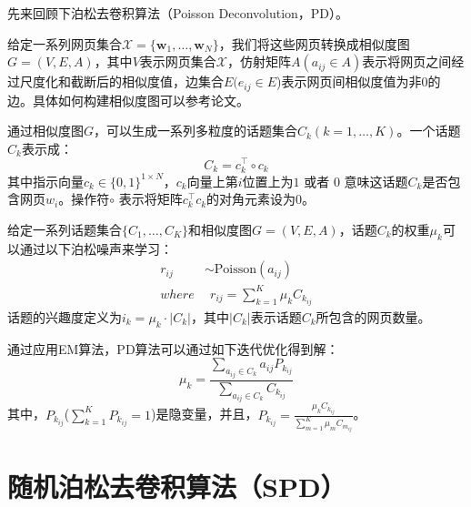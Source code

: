 先来回顾下泊松去卷积算法（Poisson Deconvolution，PD）\citep{pang-2013-unsupervised}。

给定一系列网页集合$\mathcal{X}=\{\mathbf{w}_1,\ldots,\mathbf{w}_N\}$，我们将这些网页转换成相似度图$G=(V,E,A)$，其中$V$表示网页集合$\mathcal{X}$，仿射矩阵$A(a_{ij}\in A)$表示将网页之间经过尺度化和截断后的相似度值，边集合$E(e_{ij}\in E$)表示网页间相似度值为非0的边。具体如何构建相似度图可以参考论文\citep{pang-tao-2016-lpd}。

通过相似度图$G$，可以生成一系列多粒度的话题集合$C_k(k=1,\ldots,K)$。一个话题$C_k$表示成：
\begin{equation}\label{eqt:ck}
C_{k} = c^{\top}_k{\circ} c_k
\end{equation}
其中指示向量$c_k\in\{0,1\}^{1\times N}$，$c_k$向量上第$i$位置上为$1$ 或者 $0$ 意味这话题$C_k$是否包含网页$w_i$。操作符$\circ$ 表示将矩阵$c^{\top}_k c_k$的对角元素设为0。

给定一系列话题集合$\{C_1,\ldots, C_K\}$和相似度图\mbox{$G=(V,E,A)$}，话题$C_k$的权重$\mu_k$可以通过以下泊松噪声来学习：
\begin{equation} \label{eq:poissondeconvolution}
\begin{split}
r_{ij} & \sim \text{Poisson}(a_{ij})\\
where & \ \ r_{ij} = \sum_{k=1}^{K} \mu_k C_{k_{ij}}
\end{split}
\end{equation}
话题的兴趣度定义为$i_k=\mu_k\cdot |C_k|$，其中$|C_k|$表示话题$C_k$所包含的网页数量。

通过应用EM算法，PD算法可以通过如下迭代优化得到解：
\begin{equation} \label{eq:iterationofPD}
    \mu_k = \frac{\sum_{a_{ij}\in C_k} a_{ij} P_{k_{ij}}}{\sum_{a_{ij}\in C_k} C_{k_{ij}}}
\end{equation}
其中，$P_{k_{ij}}$($\sum_{k=1}^{K} P_{k_{ij}}=1$)是隐变量，并且，$P_{k_{ij}} = \frac{\mu_k C_{k_{ij}}}{\sum_{m=1}^{K}\mu_m C_{m_{ij}}}$\citep{pang-2013-unsupervised}。



\section{随机泊松去卷积算法（SPD）}

